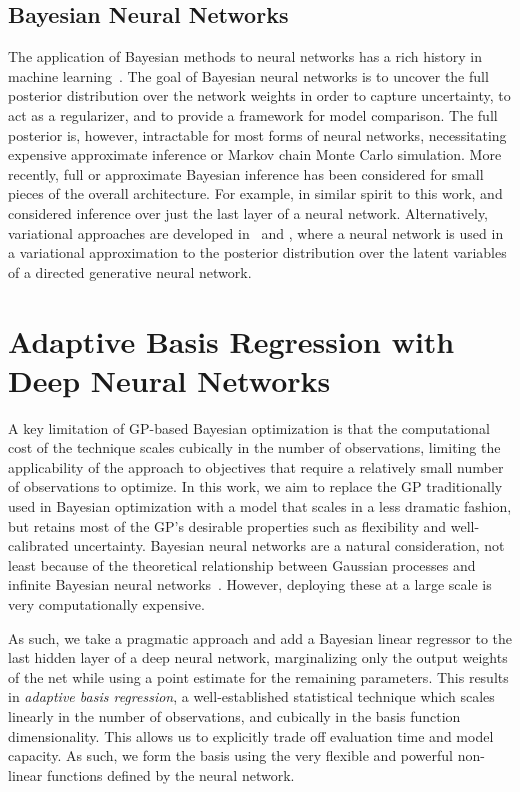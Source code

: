 \documentclass{article}
\begin{document}
\subsection{Bayesian Neural Networks}
The application of Bayesian methods to neural networks has a rich history in machine learning~\cite{mackay1992practical,hinton-camp-93,buntine1991bayesian,neal1995bayesian,de2003bayesian}. The goal of Bayesian neural networks is to uncover the full posterior distribution over the network weights in order to capture uncertainty, to act as a regularizer, and to provide a framework for model comparison. The full posterior is, however, intractable for most forms of neural networks, necessitating expensive approximate inference or Markov chain Monte Carlo simulation. More recently, full or approximate Bayesian inference has been considered for small pieces of the overall architecture. For example, in similar spirit to this work, \citet{lazaro2010marginalized,hinton2008using} and \citet{calandra2014manifold} considered inference over just the last layer of a neural network. Alternatively, variational approaches are developed in~\citet{kingma2013auto,rezende2014stochastic} and \citet{mnih2014neural}, where a neural network is used in a variational approximation to the posterior distribution over the latent variables of a directed generative neural network.


\section{Adaptive Basis Regression with Deep Neural Networks}

A key limitation of GP-based Bayesian optimization is that the computational cost of the technique scales cubically in the number of observations, limiting the applicability of the approach to objectives that require a relatively small number of observations to optimize.  In this work, we aim to replace the GP traditionally used in Bayesian optimization with a model that scales in a less dramatic fashion, but retains most of the GP's desirable properties such as flexibility and well-calibrated uncertainty.  Bayesian neural networks are a natural consideration, not least because of the theoretical relationship between Gaussian processes and infinite Bayesian neural networks~\cite{neal1995bayesian,williams-96}. However, deploying these at a large scale is very computationally expensive.

As such, we take a pragmatic approach and add a Bayesian linear regressor to the last hidden layer of a deep neural network, marginalizing only the output weights of the net while using a point estimate for the remaining parameters. This results in \emph{adaptive basis regression}, a well-established statistical technique which scales linearly in the number of observations, and cubically in the basis function dimensionality.  This allows us to explicitly trade off evaluation time and model capacity.  As such, we form the basis using the very flexible and powerful non-linear functions defined by the neural network.
\end{document}
